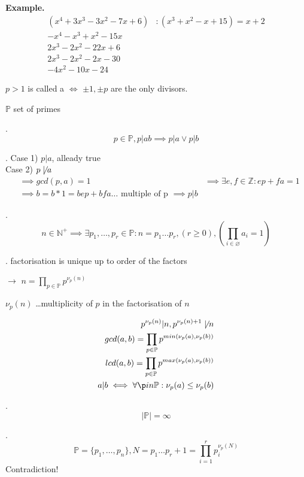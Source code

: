 \textbf{Example.}
\begin{align*}
  (x^4 + 3x^3 - 3x^2 - 7x + 6) &: ( x^3 + x^2 - x + 15) = x+2 \\
  -x^4 - x^3 + x^2 - 15 x \\
  \hline 
    2x^3 - 2x^2 - 22 x + 6 \\
    2x^3 - 2x^2 - 2 x -30 \\ 
    \hline
      -4x^2 - 10 x - 24
\end{align*}

\begin{definition}
$p>1$ is called a  $\iff$ $\pm 1, \pm p$ are the only divisors.

$\mathbb{P}$ set of primes
\end{definition}

\Theorem.
\[
  p\in \mathbb{P}, p|ab \implies p|a \vee p|b
\]

\Proof.
Case 1) $p|a$, alleady true\\
Case 2) $p \not\mid a$
\begin{align*}
  &\implies gcd(p,a) = 1 
  &\implies \exists e,f \in \mathbb{Z}: ep + fa = 1 \\
  &\implies b = b*1 = b e p + b f a \ldots \text{ multiple of p } \implies p|b
\end{align*}

\Theorem.
\[
  n \in \mathbb{N}^{+} \implies \exists p_1, \ldots ,p_r \in \mathbb{P}: n = p_1 \ldots p_r, (r \geq 0), (\prod_{i\in \varnothing} a_i = 1)
\]

\Remark.
factorisation is unique up to order of the factors

$\rightarrow$ $n = \prod_{p \in \mathbb{P}} p^{\nu_p(n)}$

$\nu_p(n)$ \ldots multiplicity of $p$ in the factorisation of $n$

\begin{align*}
 p^{\nu_p(n)} | n, p^{\nu_p(n)+1} \not\mid n\\
 gcd(a,b) = \prod_{p \in \mathbb{P}} p ^{min(\nu_p(a), \nu_p(b))} \\
 lcd(a,b) = \prod_{p \in \mathbb{P}} p ^{max(\nu_p(a), \nu_p(b))} \\
 a|b \iff \forall \p in \mathbb{P} : \nu_p(a) \leq \nu_p(b)
\end{align*}

\Theorem.
\[
  | \mathbb{P} | = \infty
\]

\Proof.
\[
  \mathbb{P} = \{p_1, \ldots , p_n\}, N = p_1 \ldots p_r + 1 = \prod_{i=1}^r p_i^{\nu_p(N)}
\]
Contradiction!

